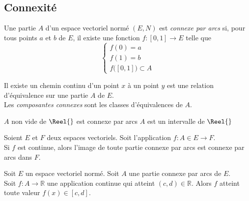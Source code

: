 \documentclass[11pt,a4paper,fleqn,pdftex]{report}
\begin{document}
\subsection{Connexité}
\begin{dfn}
    Une partie $A$ d'un espace vectoriel normé $(E,N)$  est \emph{connexe par arcs} \linebreak si, pour tous points $a$ et $b$ de $E$, il existe une fonction $f:[0,1] \to E$  telle que 
    \begin{equation}
    \left\lbrace
    \begin{gathered}
    f(0)=a \\
    f(1)=b \\
    f\big( [0,1] \big) \subset A
    \end{gathered}
    \right.
    \end{equation}
\end{dfn}
\begin{theorem}
     \og{} Il existe un chemin continu d'un point $x$ à un point $y$\fg{} %
     est une relation d'équivalence sur une partie $A$ de $E$.\\
     Les \emph{composantes connexes} sont les classes d'équivalences de $A$.
\end{theorem}
\begin{theorem}
    $A$ non vide de $\Reel{}$ est connexe par arcs  $A$ est un intervalle de $\Reel{}$
\end{theorem}
\begin{theorem}
     Soient $E$ et $F$ deux espaces vectoriels. Soit l'application $f : A\in E \to F$.\\
     Si $f$ est continue, alors l'image de toute partie connexe par arcs est connexe par arcs dans $F$.
\end{theorem}
\begin{itheorem}
     Soit $E$ un espace vectoriel normé. Soit $A$ une partie connexe par arcs de $E$. \\
     Soit $f : A \to \mathbb{R}$ une application continue qui atteint $(c,d)\in \mathbb{R}$. Alors $f$ atteint toute valeur $f(x) \in [c,d]$.
\end{itheorem}
\end{document}
